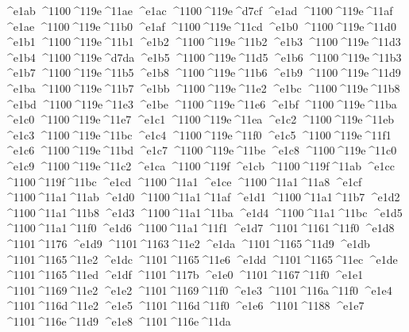 \checkit ^^^^e1ab ^^^^1100^^^^119e^^^^11ae
\checkit ^^^^e1ac ^^^^1100^^^^119e^^^^d7cf
\checkit ^^^^e1ad ^^^^1100^^^^119e^^^^11af
\checkit ^^^^e1ae ^^^^1100^^^^119e^^^^11b0
\checkit ^^^^e1af ^^^^1100^^^^119e^^^^11cd
\checkit ^^^^e1b0 ^^^^1100^^^^119e^^^^11d0
\checkit ^^^^e1b1 ^^^^1100^^^^119e^^^^11b1
\checkit ^^^^e1b2 ^^^^1100^^^^119e^^^^11b2
\checkit ^^^^e1b3 ^^^^1100^^^^119e^^^^11d3
\checkit ^^^^e1b4 ^^^^1100^^^^119e^^^^d7da
\checkit ^^^^e1b5 ^^^^1100^^^^119e^^^^11d5
\checkit ^^^^e1b6 ^^^^1100^^^^119e^^^^11b3
\checkit ^^^^e1b7 ^^^^1100^^^^119e^^^^11b5
\checkit ^^^^e1b8 ^^^^1100^^^^119e^^^^11b6
\checkit ^^^^e1b9 ^^^^1100^^^^119e^^^^11d9
\checkit ^^^^e1ba ^^^^1100^^^^119e^^^^11b7
\checkit ^^^^e1bb ^^^^1100^^^^119e^^^^11e2
\checkit ^^^^e1bc ^^^^1100^^^^119e^^^^11b8
\checkit ^^^^e1bd ^^^^1100^^^^119e^^^^11e3
\checkit ^^^^e1be ^^^^1100^^^^119e^^^^11e6
\checkit ^^^^e1bf ^^^^1100^^^^119e^^^^11ba
\checkit ^^^^e1c0 ^^^^1100^^^^119e^^^^11e7
\checkit ^^^^e1c1 ^^^^1100^^^^119e^^^^11ea
\checkit ^^^^e1c2 ^^^^1100^^^^119e^^^^11eb
\checkit ^^^^e1c3 ^^^^1100^^^^119e^^^^11bc
\checkit ^^^^e1c4 ^^^^1100^^^^119e^^^^11f0
\checkit ^^^^e1c5 ^^^^1100^^^^119e^^^^11f1
\checkit ^^^^e1c6 ^^^^1100^^^^119e^^^^11bd
\checkit ^^^^e1c7 ^^^^1100^^^^119e^^^^11be
\checkit ^^^^e1c8 ^^^^1100^^^^119e^^^^11c0
\checkit ^^^^e1c9 ^^^^1100^^^^119e^^^^11c2
\checkit ^^^^e1ca ^^^^1100^^^^119f
\checkit ^^^^e1cb ^^^^1100^^^^119f^^^^11ab
\checkit ^^^^e1cc ^^^^1100^^^^119f^^^^11bc
\checkit ^^^^e1cd ^^^^1100^^^^11a1
\checkit ^^^^e1ce ^^^^1100^^^^11a1^^^^11a8
\checkit ^^^^e1cf ^^^^1100^^^^11a1^^^^11ab
\checkit ^^^^e1d0 ^^^^1100^^^^11a1^^^^11af
\checkit ^^^^e1d1 ^^^^1100^^^^11a1^^^^11b7
\checkit ^^^^e1d2 ^^^^1100^^^^11a1^^^^11b8
\checkit ^^^^e1d3 ^^^^1100^^^^11a1^^^^11ba
\checkit ^^^^e1d4 ^^^^1100^^^^11a1^^^^11bc
\checkit ^^^^e1d5 ^^^^1100^^^^11a1^^^^11f0
\checkit ^^^^e1d6 ^^^^1100^^^^11a1^^^^11f1
\checkit ^^^^e1d7 ^^^^1101^^^^1161^^^^11f0
\checkit ^^^^e1d8 ^^^^1101^^^^1176
\checkit ^^^^e1d9 ^^^^1101^^^^1163^^^^11e2
\checkit ^^^^e1da ^^^^1101^^^^1165^^^^11d9
\checkit ^^^^e1db ^^^^1101^^^^1165^^^^11e2
\checkit ^^^^e1dc ^^^^1101^^^^1165^^^^11e6
\checkit ^^^^e1dd ^^^^1101^^^^1165^^^^11ec
\checkit ^^^^e1de ^^^^1101^^^^1165^^^^11ed
\checkit ^^^^e1df ^^^^1101^^^^117b
\checkit ^^^^e1e0 ^^^^1101^^^^1167^^^^11f0
\checkit ^^^^e1e1 ^^^^1101^^^^1169^^^^11e2
\checkit ^^^^e1e2 ^^^^1101^^^^1169^^^^11f0
\checkit ^^^^e1e3 ^^^^1101^^^^116a^^^^11f0
\checkit ^^^^e1e4 ^^^^1101^^^^116d^^^^11e2
\checkit ^^^^e1e5 ^^^^1101^^^^116d^^^^11f0
\checkit ^^^^e1e6 ^^^^1101^^^^1188
\checkit ^^^^e1e7 ^^^^1101^^^^116e^^^^11d9
\checkit ^^^^e1e8 ^^^^1101^^^^116e^^^^11da
